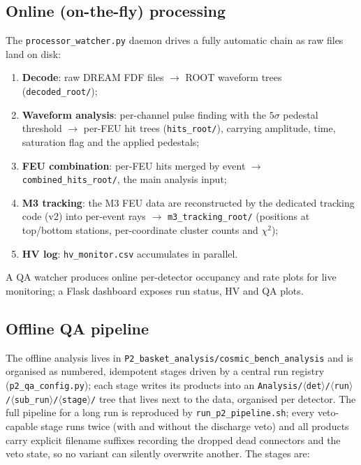 \documentclass[11pt,a4paper]{article}
\newcommand{\code}[1]{\texttt{#1}}
\begin{document}
\subsection{Online (on-the-fly) processing}

The \code{processor\_watcher.py} daemon drives a fully automatic chain as raw
files land on disk:

\begin{enumerate}[itemsep=2pt]
  \item \textbf{Decode}: raw DREAM FDF files $\rightarrow$ ROOT waveform trees
        (\code{decoded\_root/});
  \item \textbf{Waveform analysis}: per-channel pulse finding with the
        $5\sigma$ pedestal threshold $\rightarrow$ per-FEU hit trees
        (\code{hits\_root/}), carrying amplitude, time, saturation flag and
        the applied pedestals;
  \item \textbf{FEU combination}: per-FEU hits merged by event
        $\rightarrow$ \code{combined\_hits\_root/}, the main analysis input;
  \item \textbf{M3 tracking}: the M3 FEU data are reconstructed by the
        dedicated tracking code (v2) into per-event rays
        $\rightarrow$ \code{m3\_tracking\_root/} (positions at top/bottom
        stations, per-coordinate cluster counts and $\chi^2$);
  \item \textbf{HV log}: \code{hv\_monitor.csv} accumulates in parallel.
\end{enumerate}

A QA watcher produces online per-detector occupancy and rate plots for live
monitoring; a Flask dashboard exposes run status, HV and QA plots.

\subsection{Offline QA pipeline}

The offline analysis lives in \code{P2\_basket\_analysis/cosmic\_bench\_analysis}
and is organised as numbered, idempotent stages driven by a central run
registry (\code{p2\_qa\_config.py}); each stage writes its products into an
\code{Analysis/$\langle$det$\rangle$/$\langle$run$\rangle$/$\langle$sub\_run$\rangle$/$\langle$stage$\rangle$/}
tree that lives next to the data, organised per detector. The full pipeline
for a long run is reproduced by \code{run\_p2\_pipeline.sh}; every
veto-capable stage runs twice (with and without the discharge veto) and all
products carry explicit filename suffixes recording the dropped dead
connectors and the veto state, so no variant can silently overwrite another.
The stages are:
\end{document}
